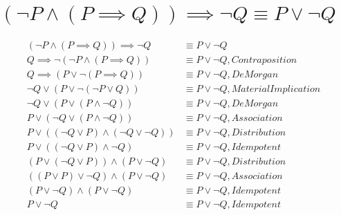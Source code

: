 \documentclass{article}
\begin{document}
\break

{\small
\section{$(\neg P \land (P \implies Q)) \implies \neg Q \equiv P \lor \neg Q$}
}
\begin{align}
	(\neg P \land (P \implies Q)) \implies \neg Q &\equiv P \lor \neg Q \\
	Q \implies \neg (\neg P \land (P \implies Q)) &\equiv P \lor \neg Q, Contraposition \\
	Q \implies (P \lor \neg (P \implies Q)) &\equiv P \lor \neg Q, De Morgan \\
	\neg Q \lor (P \lor \neg (\neg P \lor Q)) &\equiv P \lor \neg Q, Material Implication \\
	\neg Q \lor (P \lor (P \land \neg Q)) &\equiv P \lor \neg Q, De Morgan \\
	P \lor (\neg Q \lor (P \land \neg Q)) &\equiv P \lor \neg Q, Association \\
	P \lor ((\neg Q \lor P) \land (\neg Q \lor \neg Q)) &\equiv P \lor \neg Q, Distribution \\
	P \lor ((\neg Q \lor P) \land \neg Q) &\equiv P \lor \neg Q, Idempotent \\
	(P \lor (\neg Q \lor P)) \land (P \lor \neg Q) &\equiv P \lor \neg Q, Distribution \\
	((P \lor P) \lor \neg Q) \land (P \lor \neg Q) &\equiv P \lor \neg Q, Association \\
	(P \lor \neg Q) \land (P \lor \neg Q) &\equiv P \lor \neg Q, Idempotent \\
	P \lor \neg Q &\equiv P \lor \neg Q, Idempotent
\end{align}
\end{document}
